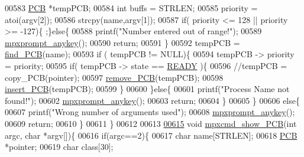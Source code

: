 \begin{DoxyCode}
{00583                 \hyperlink{structprocess}{PCB} *tempPCB;
00584                 \textcolor{keywordtype}{int} buffs = STRLEN;
00585                 priority  = atoi(argv[2]);
00586                 strcpy(name,argv[1]);
00587                 \textcolor{keywordflow}{if}( priority <= 128 || priority >= -127)\{ ;\}\textcolor{keywordflow}{else}\{
00588                         printf(\textcolor{stringliteral}{"Number entered out of range!"});
00589                         \hyperlink{mpx__util_8c_a338d01dfe3c80732c00450203c85b964}{mpxprompt_anykey}();
00590                         \textcolor{keywordflow}{return};
00591                 \}
00592                 tempPCB = \hyperlink{mpx__r2_8c_a612a6abcb66c688a32f33abc93ff3990}{find_PCB}(name);
00593                 \textcolor{keywordflow}{if} ( tempPCB != NULL)\{
00594                         tempPCB -> priority = priority;
00595                         \textcolor{keywordflow}{if}( tempPCB -> state == \hyperlink{mpx__r2_8h_ad1235d5ce36f7267285e82dccd428aa6}{READY} )\{
00596                                         \textcolor{comment}{//tempPCB = copy\_PCB(pointer);}
00597                                         \hyperlink{mpx__r2_8c_af30a3658210d449b4b53e5be2ed2bc2e}{remove_PCB}(tempPCB);
00598                                         \hyperlink{mpx__r2_8c_aa3b334e3a5afd6e590917667ad359a6f}{insert_PCB}(tempPCB);
00599                                         \}
00600                 \}\textcolor{keywordflow}{else}\{
00601                         printf(\textcolor{stringliteral}{"Process Name not found!"});
00602                         \hyperlink{mpx__util_8c_a338d01dfe3c80732c00450203c85b964}{mpxprompt_anykey}();
00603                         \textcolor{keywordflow}{return};
00604                 \}
00605         \}
00606         \textcolor{keywordflow}{else}\{
00607                 printf(\textcolor{stringliteral}{"Wrong number of arguments used"});
00608                 \hyperlink{mpx__util_8c_a338d01dfe3c80732c00450203c85b964}{mpxprompt_anykey}();
00609                 \textcolor{keywordflow}{return};
00610         \}
00611 \}
00612 
00613 
\hypertarget{mpx__r2_8c_source_l00615}{}\hyperlink{mpx__r2_8h_ae52d77243725636a3b23d05235fee141}{00615} \textcolor{keywordtype}{void} \hyperlink{mpx__r2_8c_ae52d77243725636a3b23d05235fee141}{mpxcmd_show_PCB}(\textcolor{keywordtype}{int} argc, \textcolor{keywordtype}{char} *argv[])\{
00616         \textcolor{keywordflow}{if}(argc==2)\{
00617                 \textcolor{keywordtype}{char} name[STRLEN];
00618                 \hyperlink{structprocess}{PCB} *pointer;
00619                 \textcolor{keywordtype}{char} \textcolor{keyword}{class}[30];
}
\end{DoxyCode}
